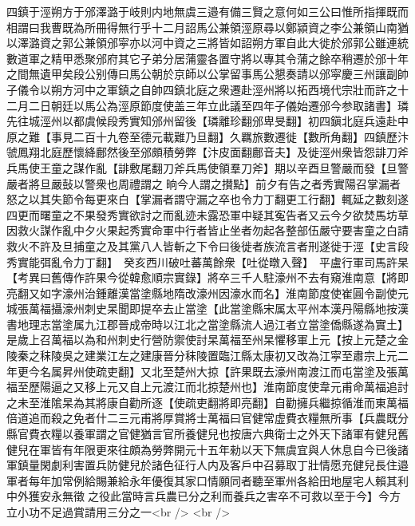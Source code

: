 四鎮于涇朔方于邠澤潞于岐則内地無虞三邉有備三賢之意何如三公曰惟所指揮既而相謂曰我曹既為所冊得無行乎十二月詔馬公兼領涇原尋以鄭潁資之李公兼領山南猶以澤潞資之郭公兼領邠寜亦以河中資之三將皆如詔朔方軍自此大徙於邠郭公雖連統數道軍之精甲悉聚邠府其它子弟分居蒲靈各置守將以專其令蒲之餘卒稍遷於邠十年之間無遺甲矣段公别傳曰馬公朝於京師以公掌留事馬公懇奏請以邠寜慶三州讓副帥子儀令以朔方河中之軍鎮之自帥四鎮北庭之衆遷赴涇州將以拓西境代宗壯而許之十二月二日朝廷以馬公為涇原節度使盖三年立此議至四年子儀始遷邠今参取諸書】璘先往城涇州以都虞候段秀實知邠州留後【璘離珍翻邠卑旻翻】初四鎭北庭兵遠赴中原之難【事見二百十九卷至德元載難乃旦翻】久羈旅數遷徙【數所角翻】四鎮歷汴虢鳳翔北庭歷懷絳鄜然後至邠頗積勞弊【汴皮面翻鄜音夫】及徙涇州衆皆怨誹刀斧兵馬使王童之謀作亂【誹敷尾翻刀斧兵馬使領羣刀斧】期以辛酉旦警嚴而發【旦警嚴者將旦嚴鼔以警衆也周禮謂之晌今人謂之攅點】前夕有告之者秀實陽召掌漏者怒之以其失節令每更來白【掌漏者謂守漏之卒也令力丁翻更工行翻】輒延之數刻遂四更而曙童之不果發秀實欲討之而亂迹未露恐軍中疑其寃告者又云今夕欲焚馬坊草因救火謀作亂中夕火果起秀實命軍中行者皆止坐者勿起各整部伍嚴守要害童之白請救火不許及旦捕童之及其黨八人皆斬之下令曰後徙者族流言者刑遂徙于涇【史言段秀實能弭亂令力丁翻】　癸亥西川破吐蕃萬餘衆【吐從暾入聲】　平盧行軍司馬許杲　【考異曰舊傳作許果今從韓愈順宗實錄】將卒三千人駐濠州不去有窺淮南意【將即亮翻又如字濠州治鍾離漢當塗縣地隋改濠州因濠水而名】淮南節度使崔圓令副使元城張萬福攝濠州刺史杲聞即提卒去止當塗【此當塗縣宋属太平州本漢丹陽縣地按漢書地理志當塗属九江郡晉成帝時以江北之當塗縣流人過江者立當塗僑縣遂為實土】是歲上召萬福以為和州刺史行營防禦使討杲萬福至州杲懼移軍上元【按上元楚之金陵秦之秣陵吳之建業江左之建康晉分秣陵置臨江縣太康初又改為江寜至肅宗上元二年更今名属昇州使疏吏翻】又北至楚州大掠【許果既去濠州南渡江而屯當塗及張萬福至歷陽逼之又移上元又自上元渡江而北掠楚州也】淮南節度使韋元甫命萬福追討之未至淮隂杲為其將康自勸所逐【使疏吏翻將即亮翻】自勸擁兵繼掠循淮而東萬福倍道追而殺之免者什二三元甫將厚賞將士萬福曰官健常虚費衣糧無所事【兵農既分縣官費衣糧以養軍謂之官健猶言官所養健兒也按唐六典衛士之外天下諸軍有健兒舊健兒在軍皆有年限更來往頗為勞弊開元十五年勑以天下無虞宜與人休息自今已後諸軍鎮量閑劇利害置兵防健兒於諸色征行人内及客戶中召募取丁壯情愿充健兒長住邉軍者每年加常例給賜兼給永年優復其家口情願同者聽至軍州各給田地屋宅人賴其利中外獲安永無徵之役此當時言兵農已分之利而養兵之害卒不可救以至于今】今方立小功不足過賞請用三分之一<br />
<br />
